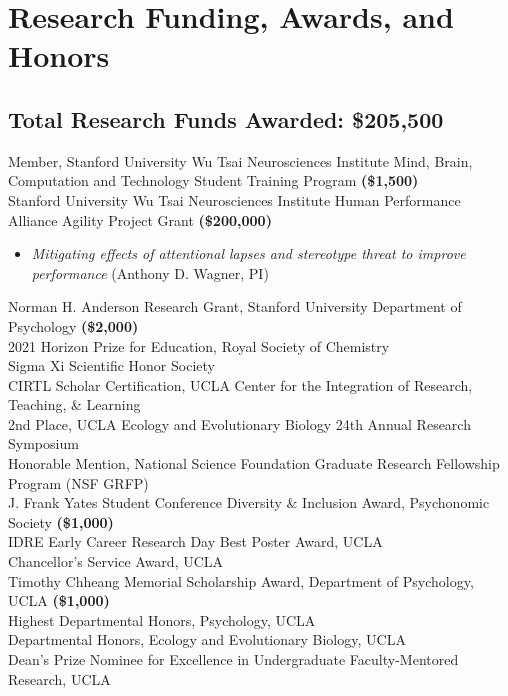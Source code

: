 \section*{Research Funding, Awards, and Honors}
\subsection*{Total Research Funds Awarded: \textbf{\$205,500}}
Member, Stanford University Wu Tsai Neurosciences Institute Mind, Brain, Computation and Technology Student Training Program \textbf{(\$1,500)}\\
Stanford University Wu Tsai Neurosciences Institute Human Performance Alliance Agility Project Grant \textbf{(\$200,000)}
\begin{itemize}[label={*}, leftmargin=0.5cm, topsep=0.2cm]
    \item \textit{Mitigating effects of attentional lapses and stereotype threat to improve performance} (Anthony D. Wagner, PI)
\end{itemize}
Norman H. Anderson Research Grant, Stanford University Department of Psychology \textbf{(\$2,000)}\\
2021 Horizon Prize for Education, Royal Society of Chemistry\\
Sigma Xi Scientific Honor Society\\
CIRTL Scholar Certification, UCLA Center for the Integration of Research, Teaching, \& Learning\\
2nd Place, UCLA Ecology and Evolutionary Biology 24th Annual Research Symposium\\
Honorable Mention, National Science Foundation Graduate Research Fellowship Program (NSF GRFP)\\
J. Frank Yates Student Conference Diversity \& Inclusion Award, Psychonomic Society \textbf{(\$1,000)}\\
IDRE Early Career Research Day Best Poster Award, UCLA\\
Chancellor's Service Award, UCLA\\
Timothy Chheang Memorial Scholarship Award, Department of Psychology, UCLA \textbf{(\$1,000)}\\
Highest Departmental Honors, Psychology, UCLA\\
Departmental Honors, Ecology and Evolutionary Biology, UCLA\\
Dean's Prize Nominee for Excellence in Undergraduate Faculty-Mentored Research, UCLA
